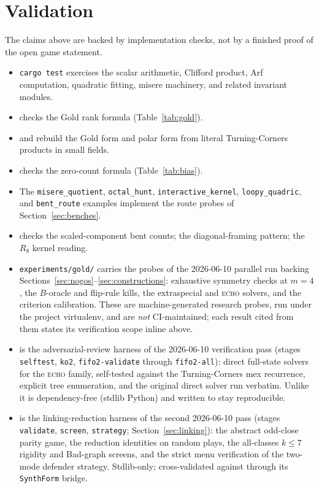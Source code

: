 \documentclass[11pt]{article}
\theoremstyle{plain}
\theoremstyle{definition}
\begin{document}
\section{Validation}\label{sec:validation}

The claims above are backed by implementation checks, not by a finished
proof of the open game statement.

\begin{itemize}[leftmargin=*]
\item \texttt{cargo test} exercises the scalar arithmetic, Clifford product,
Arf computation, quadratic fitting, misere machinery, and related invariant
modules.
\item {} checks the Gold rank formula
(Table~\ref{tab:gold}).
\item {} and
 rebuild the Gold form and polar form
from literal Turning-Corners products in small fields.
\item {} checks the zero-count formula
(Table~\ref{tab:bias}).
\item The \texttt{misere\_quotient}, \texttt{octal\_hunt},
\texttt{interactive\_kernel}, \texttt{loopy\_quadric}, and
\texttt{bent\_route} examples implement the route probes of
Section~\ref{sec:benches}.
\item {} checks the scaled-component
bent counts;  the diagonal-framing
pattern;  the $R_8$ kernel reading.
\item \texttt{experiments/gold/} carries the probes of the 2026-06-10
parallel run backing Sections~\ref{sec:nogos}--\ref{sec:constructions}:
exhaustive symmetry checks at $m=4$, the $B$-oracle and flip-rule kills,
the extraspecial and \textsc{echo} solvers, and the criterion calibration.
These are machine-generated research probes, run under the project
virtualenv, and are \emph{not} CI-maintained; each result cited from them
states its verification scope inline above.
\item {} is the adversarial-review harness
of the 2026-06-10 verification pass (stages \texttt{selftest},
\texttt{ko2}, \texttt{fifo2-validate} through \texttt{fifo2-all}): direct
full-state solvers for the \textsc{echo} family, self-tested against the
Turning-Corners mex recurrence, explicit tree enumeration, and the
original direct solver run verbatim. Unlike  it
is dependency-free (stdlib Python) and written to stay reproducible.
\item {} is the linking-reduction harness
of the second 2026-06-10 pass (stages \texttt{validate}, \texttt{screen},
\texttt{strategy}; Section~\ref{sec:linking}): the abstract odd-close
parity game, the reduction identities on random plays, the all-classes
$k\leq7$ rigidity and Bad-graph screens, and the strict menu verification
of the two-mode defender strategy. Stdlib-only; cross-validated against
 through its \texttt{SynthForm} bridge.
\end{itemize}
\end{document}
